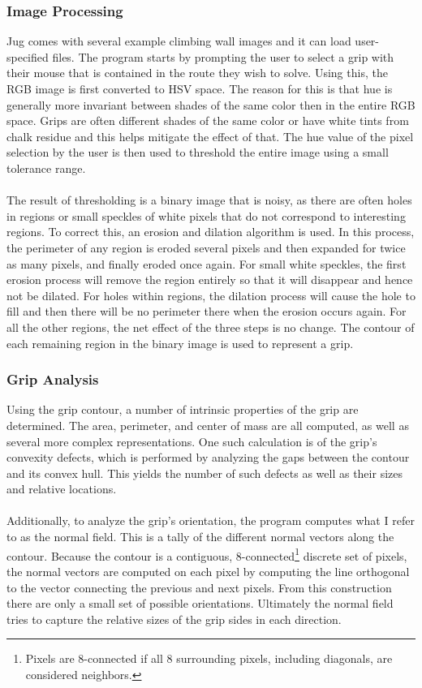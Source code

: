 \documentclass[pdftex,12pt]{article}
\theoremstyle{definition}
\theoremstyle{remark}
\begin{document}
\subsubsection*{Image Processing}
Jug comes with several example climbing wall images and it can load user-specified files. The program starts by prompting the user to select a grip with their mouse that is contained in the route they wish to solve. Using this, the RGB image is first converted to HSV space. The reason for this is that hue is generally more invariant between shades of the same color then in the entire RGB space. Grips are often different shades of the same color or have white tints from chalk residue and this helps mitigate the effect of that. The hue value of the pixel selection by the user is then used to threshold the entire image using a small tolerance range.\\ \\
The result of thresholding is a binary image that is noisy, as there are often holes in regions or small speckles of white pixels that do not correspond to interesting regions. To correct this, an erosion and dilation algorithm is used. In this process, the perimeter of any region is eroded several pixels and then expanded for twice as many pixels, and finally eroded once again. For small white speckles, the first erosion process will remove the region entirely so that it will disappear and hence not be dilated. For holes within regions, the dilation process will cause the hole to fill and then there will be no perimeter there when the erosion occurs again. For all the other regions, the net effect of the three steps is no change. The contour of each remaining region in the binary image is used to represent a grip.

\subsubsection*{Grip Analysis}
Using the grip contour, a number of intrinsic properties of the grip are determined. The area, perimeter, and center of mass are all computed, as well as several more complex representations. One such calculation is of the grip's convexity defects, which is performed by analyzing the gaps between the contour and its convex hull. This yields the number of such defects as well as their sizes and relative locations.\\ \\
Additionally, to analyze the grip's orientation, the program computes what I refer to as the normal field. This is a tally of the different normal vectors along the contour. Because the contour is a contiguous, 8-connected\footnote{Pixels are 8-connected if all 8 surrounding pixels, including diagonals, are considered neighbors.} discrete set of pixels, the normal vectors are computed on each pixel by computing the line orthogonal to the vector connecting the previous and next pixels. From this construction there are only a small set of possible orientations. Ultimately the normal field tries to capture the relative sizes of the grip sides in each direction.
\end{document}
